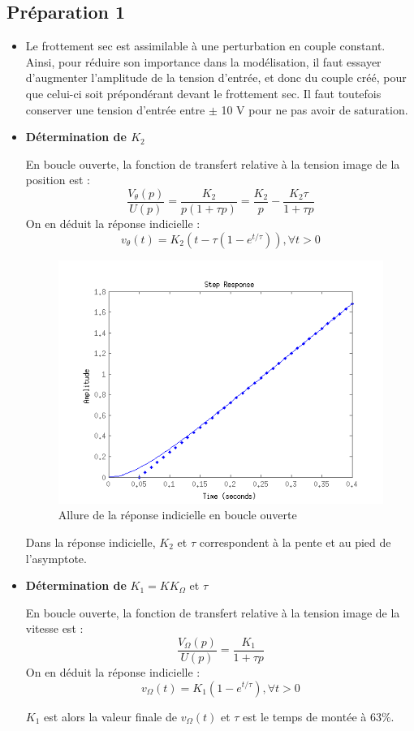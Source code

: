\documentclass[../../Cours_M1.tex]{subfiles}
\begin{document}
\subsection*{Préparation 1}
\begin{itemize}\setlength{\itemsep}{10mm}
\item Le frottement sec est assimilable à une perturbation en couple constant. Ainsi, pour réduire son importance dans la modélisation, il faut essayer d'augmenter l'amplitude de la tension d'entrée, et donc du couple créé, pour que celui-ci soit prépondérant devant le frottement sec. Il faut toutefois conserver une tension d'entrée entre $\pm$ 10 V pour ne pas avoir de saturation.

\item \textbf{Détermination de $K_2$}

En boucle ouverte, la fonction de transfert relative à la tension image de la position est : 
\[\frac{V_{\theta}(p)}{U(p)} = \frac{K_2}{p(1+\tau p)} = \frac{K_2}{p}-\frac{K_2\tau}{1+\tau p}\]
On en déduit la réponse indicielle :
\[v_{\theta}(t) = K_2(t -  \tau(1-e^{t/\tau})), \forall t>0\]
\begin{figure}[h!]
\centering
\includegraphics[scale=0.5]{indBO.png}
\caption{Allure de la réponse indicielle en boucle ouverte}
\end{figure}

Dans la réponse indicielle, $K_2$ et $\tau$ correspondent à la pente et au pied de l'asymptote.

\item \textbf{Détermination de} $K_1=KK_{\Omega}$ et $\tau$

En boucle ouverte, la fonction de transfert relative à la tension image de la vitesse est : 
\[\frac{V_{\Omega}(p)}{U(p)} = \frac{K_1}{1+\tau p} \]
On en déduit la réponse indicielle :
\[v_{\Omega}(t) = K_1(1-e^{t/\tau}), \forall t>0\]

$K_1$ est alors la valeur finale de $v_{\Omega}(t)$ et  $\tau$ est le temps de montée à $63\%$.
\end{itemize}
\end{document}
